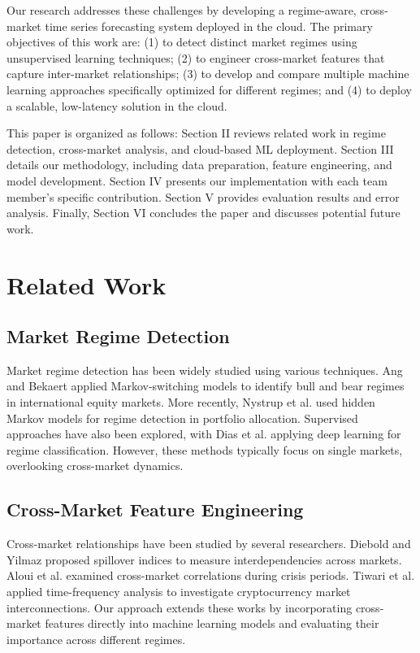 \documentclass[conference]{IEEEtran}
\begin{document}
Our research addresses these challenges by developing a regime-aware, cross-market time series forecasting system deployed in the cloud. The primary objectives of this work are: (1) to detect distinct market regimes using unsupervised learning techniques; (2) to engineer cross-market features that capture inter-market relationships; (3) to develop and compare multiple machine learning approaches specifically optimized for different regimes; and (4) to deploy a scalable, low-latency solution in the cloud.

This paper is organized as follows: Section II reviews related work in regime detection, cross-market analysis, and cloud-based ML deployment. Section III details our methodology, including data preparation, feature engineering, and model development. Section IV presents our implementation with each team member's specific contribution. Section V provides evaluation results and error analysis. Finally, Section VI concludes the paper and discusses potential future work.

\section{Related Work}
\subsection{Market Regime Detection}
Market regime detection has been widely studied using various techniques. Ang and Bekaert \cite{ang2002regime} applied Markov-switching models to identify bull and bear regimes in international equity markets. More recently, Nystrup et al. \cite{nystrup2020dynamic} used hidden Markov models for regime detection in portfolio allocation. Supervised approaches have also been explored, with Dias et al. \cite{dias2020deep} applying deep learning for regime classification. However, these methods typically focus on single markets, overlooking cross-market dynamics.

\subsection{Cross-Market Feature Engineering}
Cross-market relationships have been studied by several researchers. Diebold and Yilmaz \cite{diebold2012better} proposed spillover indices to measure interdependencies across markets. Aloui et al. \cite{aloui2011global} examined cross-market correlations during crisis periods. Tiwari et al. \cite{tiwari2021time} applied time-frequency analysis to investigate cryptocurrency market interconnections. Our approach extends these works by incorporating cross-market features directly into machine learning models and evaluating their importance across different regimes.
\end{document}
